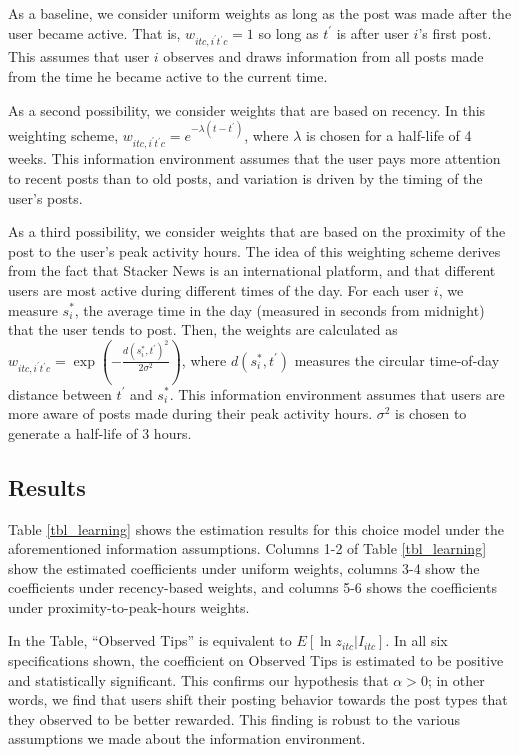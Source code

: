 As a baseline, we consider uniform weights as long as the post was made after the user became active. That is, $w_{itc,i^\prime t^\prime c} = 1$ so long as $t^\prime$ is after user $i$'s first post. This assumes that user $i$ observes and draws information from all posts made from the time he became active to the current time.

As a second possibility, we consider weights that are based on recency. In this weighting scheme, $w_{itc,i^\prime t^\prime c} = e^{-\lambda (t - t^\prime)}$, where $\lambda$ is chosen for a half-life of 4 weeks. This information environment assumes that the user pays more attention to recent posts than to old posts, and variation is driven by the timing of the user's posts.

As a third possibility, we consider weights that are based on the proximity of the post to the user's peak activity hours. The idea of this weighting scheme derives from the fact that Stacker News is an international platform, and that different users are most active during different times of the day. For each user $i$, we measure $s_{i}^*$, the average time in the day (measured in seconds from midnight) that the user tends to post. Then, the weights are calculated as $w_{itc, i^\prime t^\prime c} = \exp\left(-\frac{d(s_i^*, t^\prime)^2}{2\sigma^2} \right)$, where $d(s_i^*, t^\prime)$ measures the circular time-of-day distance between $t^\prime$ and $s_i^*$. This information environment assumes that users are more aware of posts made during their peak activity hours.  $\sigma^2$ is chosen to generate a half-life of 3 hours.

\subsection{Results}

Table \ref{tbl_learning} shows the estimation results for this choice model under the aforementioned information assumptions. Columns 1-2 of Table \ref{tbl_learning} show the estimated coefficients under uniform weights, columns 3-4 show the coefficients under recency-based weights, and columns 5-6 shows the coefficients under proximity-to-peak-hours weights.

In the Table, ``Observed Tips'' is equivalent to $E\left[ \ln z_{itc} | I_{itc} \right]$. In all six specifications shown, the coefficient on Observed Tips is estimated to be positive and statistically significant. This confirms our hypothesis that $\alpha>0$; in other words, we find that users shift their posting behavior towards the post types that they observed to be better rewarded. This finding is robust to the various assumptions we made about the information environment.

